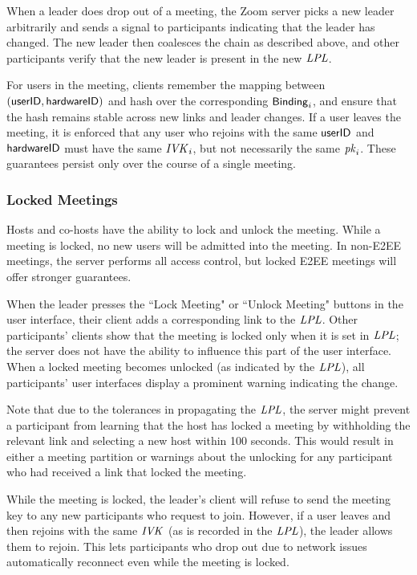 When a leader does drop out of a meeting, the Zoom server picks a new leader arbitrarily and sends a signal to participants indicating that the leader has changed. The new leader then coalesces the chain as described above, and other participants verify that the new leader is present in the new $\mathit{LPL}$.

For users in the meeting, clients remember the mapping between $(\mathsf{userID}, {\sf hardwareID})$ and hash over the corresponding
${\sf Binding}_i$, and ensure that the hash remains stable across new links and leader changes. If a user leaves the meeting,
it is enforced that any user who rejoins with the same $\mathsf{userID}$ and ${\sf hardwareID}$ must have the same $\mathit{IVK}_i$, but not necessarily the same $\mathit{pk}_i$. These guarantees persist only over the course of a single meeting.

\subsubsection{Locked Meetings}
\label{subsubsec:lockedmeetings}
Hosts and co-hosts have the ability to lock and unlock the meeting. While a meeting is locked, no new users will be admitted into the meeting. In non-E2EE meetings, the server performs all access control, but locked E2EE meetings will offer stronger guarantees.

When the leader presses the ``Lock Meeting" or ``Unlock Meeting" buttons in the user interface, their client adds a corresponding link to the $\mathit{LPL}$. Other participants' clients show that the meeting is locked only when it is set in $\mathit{LPL}$; the server does not have the ability to influence this part of the user interface. When a locked meeting becomes unlocked (as indicated by the $\mathit{LPL}$), all participants' user interfaces display a prominent warning indicating the change. 

Note that due to the tolerances in propagating the $\mathit{LPL}$, the server might prevent a participant from learning that the host has locked a meeting by withholding the relevant link and selecting a new host within 100 seconds. This would result in either a meeting partition or warnings about the unlocking for any participant who had received a link that locked the meeting.

While the meeting is locked, the leader's client will refuse to send the meeting key to any new participants who request to join. However, if a user leaves and then rejoins with the same $\mathit{IVK}$ (as is recorded in the $\mathit{LPL}$), the leader allows them to rejoin. This lets participants who drop out due to network issues automatically reconnect even while the meeting is locked. 

